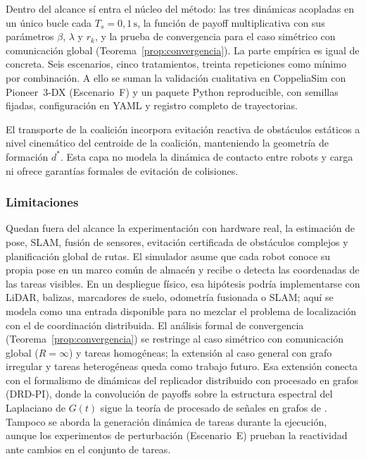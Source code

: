 Dentro del alcance sí entra el núcleo del método: las tres dinámicas acopladas en un
único bucle cada $T_s = 0{,}1\,\text{s}$, la función de payoff multiplicativa con sus
parámetros $\beta$, $\lambda$ y $r_k$, y la prueba de convergencia para el caso
simétrico con comunicación global (Teorema~\ref{prop:convergencia}). La parte empírica
es igual de concreta. Seis escenarios, cinco tratamientos, treinta repeticiones como
mínimo por combinación. A ello se suman la validación cualitativa en CoppeliaSim con
Pioneer~3-DX (Escenario~F) y un paquete Python reproducible, con semillas fijadas,
configuración en YAML y registro completo de trayectorias.

El transporte de la coalición incorpora evitación reactiva de obstáculos estáticos a
nivel cinemático del centroide de la coalición, manteniendo la geometría de formación
$d^*$. Esta capa no modela la dinámica de contacto entre robots y carga ni ofrece
garantías formales de evitación de colisiones.

\subsubsection{Limitaciones}

Quedan fuera del alcance la experimentación con hardware real, la estimación de pose,
SLAM, fusión de sensores, evitación certificada de obstáculos complejos y planificación
global de rutas. El simulador asume que cada robot conoce su propia pose en un marco
común de almacén y recibe o detecta las coordenadas de las tareas visibles. En un
despliegue físico, esa hipótesis podría implementarse con LiDAR, balizas, marcadores de
suelo, odometría fusionada o SLAM; aquí se modela como una entrada disponible para no
mezclar el problema de localización con el de coordinación distribuida.
El análisis formal de convergencia (Teorema~\ref{prop:convergencia}) se
restringe al caso simétrico con comunicación global ($R = \infty$) y tareas
homogéneas; la extensión al caso general con grafo irregular y tareas
heterogéneas queda como trabajo futuro. Esa extensión conecta con el
formalismo de dinámicas del replicador distribuido con procesado en grafos
(DRD-PI), donde la convolución de payoffs sobre la estructura espectral del
Laplaciano de $G(t)$ sigue la teoría de procesado de señales en grafos de
\citet{sandryhaila2013dsp}. Tampoco se aborda la generación dinámica de tareas
durante la ejecución, aunque los experimentos de perturbación (Escenario~E)
prueban la reactividad ante cambios en el conjunto de tareas.

